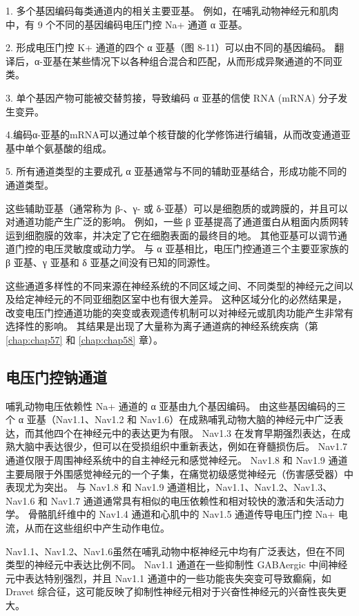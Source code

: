 1. 多个基因编码每类通道内的相关主要亚基。 
例如，在哺乳动物神经元和肌肉中，有 9 个不同的基因编码电压门控 Na+ 通道 α 亚基。


2. 形成电压门控 K+ 通道的四个 α 亚基（图 8-11）可以由不同的基因编码。 
翻译后，α-亚基在某些情况下以各种组合混合和匹配，从而形成异聚通道的不同亚类。 


3. 单个基因产物可能被交替剪接，导致编码 α 亚基的信使 RNA (mRNA) 分子发生变异。 


4.编码α-亚基的mRNA可以通过单个核苷酸的化学修饰进行编辑，从而改变通道亚基中单个氨基酸的组成。 


5. 所有通道类型的主要成孔 α 亚基通常与不同的辅助亚基结合，形成功能不同的通道类型。


这些辅助亚基（通常称为 β-、γ- 或 δ-亚基）可以是细胞质的或跨膜的，并且可以对通道功能产生广泛的影响。 
例如，一些 β 亚基提高了通道蛋白从粗面内质网转运到细胞膜的效率，并决定了它在细胞表面的最终目的地。 
其他亚基可以调节通道门控的电压灵敏度或动力学。 
与 α 亚基相比，电压门控通道三个主要亚家族的 β 亚基、γ 亚基和 δ 亚基之间没有已知的同源性。


这些通道多样性的不同来源在神经系统的不同区域之间、不同类型的神经元之间以及给定神经元的不同亚细胞区室中也有很大差异。 
这种区域分化的必然结果是，改变电压门控通道功能的突变或表观遗传机制可以对神经元或肌肉功能产生非常有选择性的影响。 
其结果是出现了大量称为离子通道病的神经系统疾病（第 \ref{chap:chap57} 和 \ref{chap:chap58} 章）。


\subsection{电压门控钠通道}
哺乳动物电压依赖性 Na+ 通道的 α 亚基由九个基因编码。 由这些基因编码的三个 α 亚基（Nav1.1、Nav1.2 和 Nav1.6）在成熟哺乳动物大脑的神经元中广泛表达，而其他四个在神经元中的表达更为有限。 Nav1.3 在发育早期强烈表达，在成熟大脑中表达很少，但可以在受损组织中重新表达，例如在脊髓损伤后。 Nav1.7 通道仅限于周围神经系统中的自主神经元和感觉神经元。 
Nav1.8 和 Nav1.9 通道主要局限于外围感觉神经元的一个子集，在痛觉初级感觉神经元（伤害感受器）中表现尤为突出。 
与 Nav1.8 和 Nav1.9 通道相比，Nav1.1、Nav1.2、Nav1.3、Nav1.6 和 Nav1.7 通道通常具有相似的电压依赖性和相对较快的激活和失活动力学。 
骨骼肌纤维中的 Nav1.4 通道和心肌中的 Nav1.5 通道传导电压门控 Na+ 电流，从而在这些组织中产生动作电位。


Nav1.1、Nav1.2、Nav1.6虽然在哺乳动物中枢神经元中均有广泛表达，但在不同类型的神经元中表达比例不同。 
Nav1.1 通道在一些抑制性 GABAergic 中间神经元中表达特别强烈，并且 Nav1.1 通道中的一些功能丧失突变可导致癫痫，如 Dravet 综合征，这可能反映了抑制性神经元相对于兴奋性神经元的兴奋性丧失更大。


